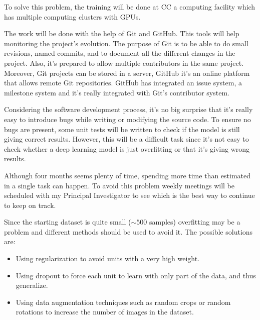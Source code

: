 To solve this problem, the training will be done at \gls{CC} a computing facility which 
has multiple computing clusters with \glspl{GPU}.


The work will be done with the help of Git and GitHub. This tools will help monitoring
the project's evolution. The purpose of Git is to be able to do small revisions,
named commits, and to document all the different changes in the project. Also, it's 
prepared to allow multiple contributors in the same project. Moreover,
Git projects can be stored in a server, GitHub it's an online platform that allows
remote Git repositories. GitHub has integrated an issue system, a milestone system
and it's really integrated with Git's contributor system.
~\cite{tool:git, tool:github}


Considering the software development process, it's no big surprise that it's really easy to
introduce bugs while writing or modifying the source code. To ensure no bugs are present,
some unit tests will be written to check if the model is still giving correct results.
However, this will be a difficult task since it's not easy to check whether a deep 
learning model is just overfitting or that it's giving wrong results.


Although four months seems plenty of time, spending more time than estimated in a single task
can happen. To avoid this problem weekly meetings will be scheduled with my Principal Investigator
to see which is the best way to continue to keep on track.


Since the starting dataset is quite small (\( \sim 500 \) samples) overfitting may be a problem
and different methods should be used to avoid it. The possible solutions are:
\begin{itemize}
  \item Using regularization to avoid units with a very high weight.
  \item Using dropout to force each unit to learn with only part of the data, and thus generalize.
  \item Using data augmentation techniques such as random crops or random rotations to increase
  the number of images in the dataset.
\end{itemize}
